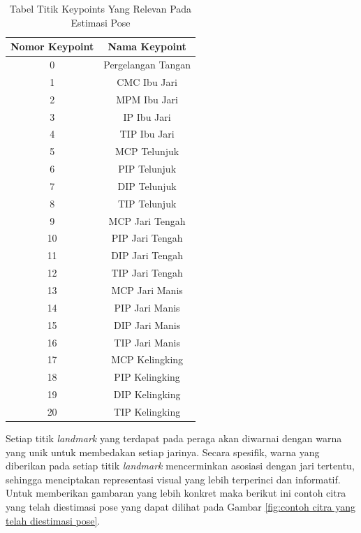 \begin{table}[h]
  \caption{Tabel Titik Keypoints Yang Relevan Pada Estimasi Pose\cite{Developer_2023}}
  \label{tbl:titik keypoints}
  \centering
  \begin{tabular}{|c|c|}
    \hline
    Nomor Keypoint & Nama Keypoint      \\ \hline
    0              & Pergelangan Tangan \\ \hline
    1              & CMC Ibu Jari       \\ \hline
    2              & MPM Ibu Jari       \\ \hline
    3              & IP Ibu Jari        \\ \hline
    4              & TIP Ibu Jari       \\ \hline
    5              & MCP Telunjuk       \\ \hline
    6              & PIP Telunjuk       \\ \hline
    7              & DIP Telunjuk       \\ \hline
    8              & TIP Telunjuk       \\ \hline
    9              & MCP Jari Tengah    \\ \hline
    10             & PIP Jari Tengah    \\ \hline
    11             & DIP Jari Tengah    \\ \hline
    12             & TIP Jari Tengah    \\ \hline
    13             & MCP Jari Manis     \\ \hline
    14             & PIP Jari Manis     \\ \hline
    15             & DIP Jari Manis     \\ \hline
    16             & TIP Jari Manis     \\ \hline
    17             & MCP Kelingking     \\ \hline
    18             & PIP Kelingking     \\ \hline
    19             & DIP Kelingking     \\ \hline
    20             & TIP Kelingking     \\ \hline
  \end{tabular}
\end{table}

Setiap titik \emph{landmark} yang terdapat pada peraga akan diwarnai dengan warna yang unik untuk membedakan setiap jarinya. Secara spesifik, warna yang diberikan pada setiap titik \emph{landmark} mencerminkan asosiasi dengan jari tertentu, sehingga menciptakan representasi visual yang lebih terperinci dan informatif. Untuk memberikan gambaran yang lebih konkret maka berikut ini contoh citra yang telah diestimasi pose yang dapat dilihat pada Gambar \ref{fig:contoh citra yang telah diestimasi pose}.

